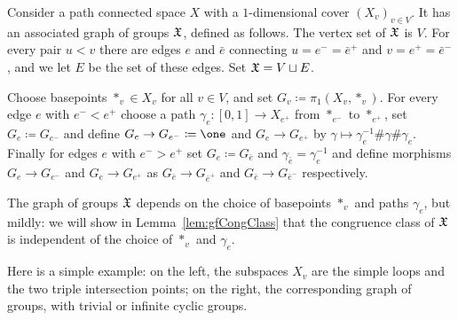 \documentclass{amsart}
\begin{document}
\begin{defn}\label{defn:gog_1dimcovers}
  Consider a path connected space $X$ with a $1$-dimensional cover
  $(X_v)_{v\in V}$. It has an associated graph of groups ${\mathfrak X}$, defined as
  follows. The vertex set of ${\mathfrak X}$ is $V$. For every pair $u<v$ there are
  edges $e$ and $\bar e$ connecting $u=e^-=\bar e^+$ and $v=e^+=\bar e^-$,
  and we let $E$ be the set of these edges. Set ${\mathfrak X}=V\sqcup E$.

  Choose basepoints $*_v\in X_v$ for all $v\in V$, and set
  $G_v\coloneqq\pi_1(X_v,*_v)$. For every edge $e$ with $e^-<e^+$
  choose a path $\gamma_e\colon[0,1]\to X_{e^+}$ from $*_{e^-}$ to
  $*_{e^+}$, set $G_e\coloneqq G_{e^-}$ and define
  $G_e\to G_{e^-}\coloneqq\one$ and $G_e\to G_{e^+}$ by
  $\gamma\mapsto\gamma_e^{-1}\#\gamma\#\gamma_e$. Finally for edges
  $e$ with $e^->e^+$ set $G_e\coloneqq G_{\bar e}$ and
  $\gamma_{\bar e}=\gamma_e^{-1}$ and define morphisms
  $G_e\to G_{e^-}$ and $G_e\to G_{e^+}$ as
  $G_{\bar e}\to G_{\bar e^+}$ and $G_{\bar e}\to G_{\bar e^-}$
  respectively.
\end{defn}

The graph of groups ${\mathfrak X}$ depends on the choice of basepoints $*_v$ and
paths $\gamma_e$, but mildly: we will show in Lemma~\ref{lem:gfCongClass}
that the congruence class of ${\mathfrak X}$ is independent of the choice of $*_v$
and $\gamma_e$.

Here is a simple example: on the left, the subspaces $X_v$ are the
simple loops and the two triple intersection points; on the right, the
corresponding graph of groups, with trivial or infinite cyclic groups.
\begin{center}
\end{center}
\end{document}
